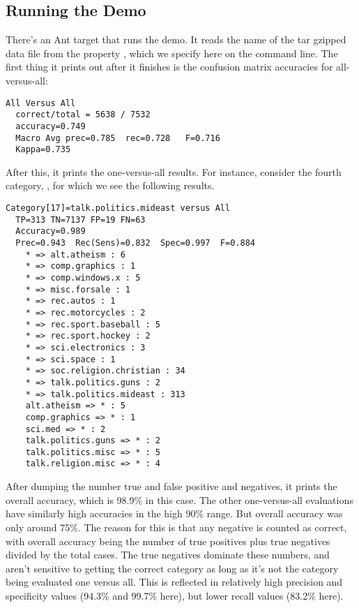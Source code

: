 \subsection{Running the Demo}

There's an Ant target  that runs the demo.
It reads the name of the tar gzipped data file from
the property , which we specify here
on the command line.
%
%
The first thing it prints out after it finishes is the confusion
matrix accuracies for all-versus-all:
%
\begin{verbatim}
All Versus All
  correct/total = 5638 / 7532
  accuracy=0.749
  Macro Avg prec=0.785  rec=0.728   F=0.716
  Kappa=0.735
\end{verbatim}
%
After this, it prints the one-versus-all results.  For instance,
consider the fourth category, ,
for which we see the following results.
%
\begin{verbatim}
Category[17]=talk.politics.mideast versus All
  TP=313 TN=7137 FP=19 FN=63
  Accuracy=0.989
  Prec=0.943  Rec(Sens)=0.832  Spec=0.997  F=0.884
    * => alt.atheism : 6
    * => comp.graphics : 1
    * => comp.windows.x : 5
    * => misc.forsale : 1
    * => rec.autos : 1
    * => rec.motorcycles : 2
    * => rec.sport.baseball : 5
    * => rec.sport.hockey : 2
    * => sci.electronics : 3
    * => sci.space : 1
    * => soc.religion.christian : 34
    * => talk.politics.guns : 2
    * => talk.politics.mideast : 313
    alt.atheism => * : 5
    comp.graphics => * : 1
    sci.med => * : 2
    talk.politics.guns => * : 2
    talk.politics.misc => * : 5
    talk.religion.misc => * : 4
\end{verbatim}
%
After dumping the number true and false positive and negatives, it
prints the overall accuracy, which is 98.9\% in this case.  The other
one-versus-all evaluations have similarly high accuracies in the high
90\% range.  But overall accuracy was only around 75\%.  The reason
for this is that any negative is counted as correct, with overall
accuracy being the number of true positives plus true negatives
divided by the total cases.  The true negatives dominate these
numbers, and aren't sensitive to getting the correct category as long
as it's not the category being evaluated one versus all.  This is
reflected in relatively high precision and specificity values (94.3\%
and 99.7\% here), but lower recall values (83.2\% here).

